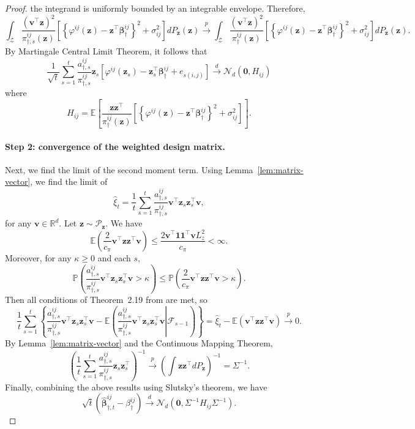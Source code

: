 \documentclass[12pt]{article}
\begin{document}
\begin{proof}
the integrand is uniformly bounded by an integrable envelope. Therefore,
\[
\int_{\mathcal Z}
\frac{(\bm v^\top\bm z)^2}{\pi_{\dagger,s}^{ij}(\bm z)}
\left[
\left\{
\varphi^{ij}(\bm z)
-
\bm z^\top\bm\beta_\dagger^{ij}
\right\}^2
+
\sigma_{ij}^2
\right]
dP_{\bm z}(\bm z)
\stackrel{p}{\to}
\int_{\mathcal Z}
\frac{(\bm v^\top\bm z)^2}{\pi_\dagger^{ij}(\bm z)}
\left[
\left\{
\varphi^{ij}(\bm z)
-
\bm z^\top\bm\beta_\dagger^{ij}
\right\}^2
+
\sigma_{ij}^2
\right]
dP_{\bm z}(\bm z).
\]
By Martingale Central Limit Theorem, it follows that
\[
\frac1{\sqrt t}
\sum_{s=1}^t
\frac{a_{\dagger,s}^{ij}}{\pi_{\dagger,s}^{ij}}
\bm z_s
\left[
\varphi^{ij}(\bm z_s)
-
\bm z_s^\top\bm\beta_\dagger^{ij}
+e_{s(i,j)}
\right]
\stackrel{d}{\to}
\mathcal N_d
\left(
\bm 0,
H_{ij}
\right)
\]
where 
$$H_{ij}
=
\mathbb E
\left[
\frac{\bm z\bm z^\top}{\pi_\dagger^{ij}(\bm z)}
\left[
\left\{
\varphi^{ij}(\bm z)
-
\bm z^\top\bm\beta_\dagger^{ij}
\right\}^2
+
\sigma_{ij}^2
\right]
\right].$$


\paragraph{Step 2: convergence of the weighted design matrix.}
Next, we find the limit of the second moment term. Using Lemma~\ref{lem:matrix-vector}, we find the limit of
\[
\widehat{\xi}_t
=
\frac{1}{t}
\sum_{s=1}^t
\frac{a_{\dagger,s}^{ij}}{\pi_{\dagger,s}^{ij}}
\bm v^\top \bm z_s \bm z_s^\top \bm v,
\]
for any $\bm v\in\mathbb R^d$. Let $\bm z\sim \mathcal P_{\bm z}$. We have
\[
\mathbb E
\left(
\frac{2}{c_\pi}
\bm v^\top \bm z\bm z^\top \bm v
\right)
\le
\frac{
2\bm v^\top \bm 1\bm 1^\top \bm v L_z^2
}{
c_\pi
}
<\infty.
\]
Moreover, for any $\kappa \ge 0$ and each $s$,
\[
\mathbb P
\left(
\frac{a_{\dagger,s}^{ij}}{\pi_{\dagger,s}^{ij}}
\bm v^\top \bm z_s\bm z_s^\top \bm v
>
\kappa
\right)
\le
\mathbb P
\left(
\frac{2}{c_\pi}
\bm v^\top \bm z\bm z^\top \bm v
>
\kappa
\right).
\]
Then all conditions of Theorem~2.19 from \citet{hall1980martingale} are met,
so
\[
\frac{1}{t}
\sum_{s=1}^t
\left\{
\frac{a_{\dagger,s}^{ij}}{\pi_{\dagger,s}^{ij}}
\bm v^\top \bm z_s\bm z_s^\top \bm v
-
\mathbb E
\left(
\left.
\frac{a_{\dagger,s}^{ij}}{\pi_{\dagger,s}^{ij}}
\bm v^\top \bm z_s\bm z_s^\top \bm v
\right|
\mathcal F_{s-1}
\right)
\right\}
=
\widehat{\xi}_t
-
\mathbb E
\left(
\bm v^\top \bm z\bm z^\top \bm v
\right)
\stackrel{p}{\to}
0.
\]
By Lemma~\ref{lem:matrix-vector} and the Continuous Mapping Theorem,
\[
\left(
\frac{1}{t}
\sum_{s=1}^t
\frac{a_{\dagger,s}^{ij}}{\pi_{\dagger,s}^{ij}}
\bm z_s\bm z_s^\top
\right)^{-1}
\stackrel{p}{\to}
\left(
\int \bm z\bm z^\top dP_{\bm z}
\right)^{-1}
=
\Sigma^{-1}.
\]
Finally, combining the above results using Slutsky's theorem, we have
\[
\sqrt t
\left(
\widehat{\bm\beta}_{\dagger,t}^{ij}
-
\beta_\dagger^{ij}
\right)
\stackrel{d}{\to}
\mathcal N_d
\left(
\bm 0,
\Sigma^{-1}H_{ij}\Sigma^{-1}
\right).
\]


\end{proof}
\end{document}

